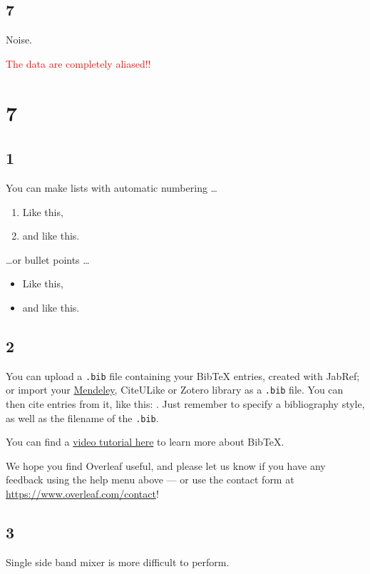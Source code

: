 \documentclass[a4paper]{article}
\begin{document}

\subsection{7}

Noise.

\textcolor{red}{The data are completely aliased!!}

\section{7}

\subsection{1}

You can make lists with automatic numbering \dots

\begin{enumerate}
\item Like this,
\item and like this.
\end{enumerate}
\dots or bullet points \dots
\begin{itemize}
\item Like this,
\item and like this.
\end{itemize}

\subsection{2}

You can upload a \verb|.bib| file containing your BibTeX entries, created with JabRef; or import your \href{https://www.overleaf.com/blog/184}{Mendeley}, CiteULike or Zotero library as a \verb|.bib| file. You can then cite entries from it, like this: \cite{greenwade93}. Just remember to specify a bibliography style, as well as the filename of the \verb|.bib|.

You can find a \href{https://www.overleaf.com/help/97-how-to-include-a-bibliography-using-bibtex}{video tutorial here} to learn more about BibTeX.

We hope you find Overleaf useful, and please let us know if you have any feedback using the help menu above --- or use the contact form at \url{https://www.overleaf.com/contact}!

\subsection{3}


Single side band mixer is more difficult to perform.



\end{document}

